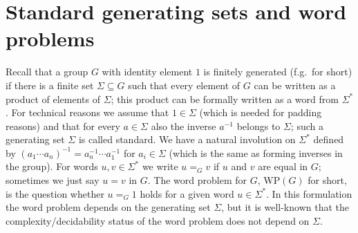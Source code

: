\section*{Standard generating sets and word problems}
Recall that a group $G$ with identity element $1$ is finitely generated (f.g.\ for short) if there is a finite set $\Sigma\subseteq G$ such that every element of $G$ can be written as a product of elements of $\Sigma$; this product can be formally written as a word from $\Sigma^*$. For technical reasons we assume that $1\in\Sigma$ (which is needed for padding reasons) and that for every $a\in\Sigma$ also the inverse $a^{-1}$ belongs to $\Sigma$; such a generating set $\Sigma$ is called standard. We have a natural involution on $\Sigma^*$ defined by $(a_1\cdots a_n)^{-1}=a_n^{-1}\cdots a_1^{-1}$ for $a_i\in\Sigma$ (which is the same as forming inverses in the group). For words $u,v\in\Sigma^*$ we write $u=_Gv$ if $u$ and $v$ are equal in $G$; sometimes we just say $u=v$ in $G$. The word problem for $G$, $\mathrm{WP}(G)$ for short, is the question whether $u=_G1$ holds for a given word $u\in\Sigma^*$. In this formulation the word problem depends on the generating set $\Sigma$, but it is well-known that the complexity/decidability status of the word problem does not depend on $\Sigma$.
